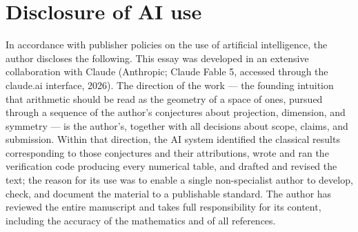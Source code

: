\documentclass[11pt]{article}
\theoremstyle{remark}
\begin{document}
\section*{Disclosure of AI use}

In accordance with publisher policies on the use of artificial intelligence, the author discloses the
following. This essay was developed in an extensive collaboration with Claude (Anthropic; Claude
Fable 5, accessed through the claude.ai interface, 2026). The direction of the work --- the founding
intuition that arithmetic should be read as the geometry of a space of ones, pursued through a
sequence of the author's conjectures about projection, dimension, and symmetry --- is the author's,
together with all decisions about scope, claims, and submission. Within that direction, the AI system
identified the classical results corresponding to those conjectures and their attributions, wrote and
ran the verification code producing every numerical table, and drafted and revised the text; the
reason for its use was to enable a single non-specialist author to develop, check, and document the
material to a publishable standard. The author has reviewed the entire manuscript and takes full
responsibility for its content, including the accuracy of the mathematics and of all references.
\end{document}
